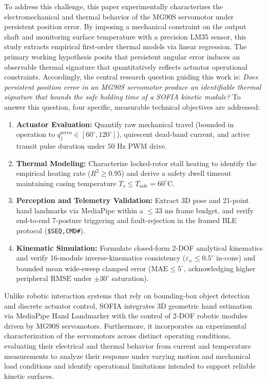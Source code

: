\documentclass[lettersize,journal]{IEEEtran}
\begin{document}
	To address this challenge, this paper experimentally characterizes the electromechanical and thermal behavior of the MG90S servomotor under persistent position error. By imposing a mechanical constraint on the output shaft and monitoring surface temperature with a precision LM35 sensor, this study extracts empirical first-order thermal models via linear regression. The primary working hypothesis posits that persistent angular error induces an observable thermal signature that quantitatively reflects actuator operational constraints. Accordingly, the central research question guiding this work is: \textit{Does persistent position error in an MG90S servomotor produce an identifiable thermal signature that bounds the safe holding time of a SOFIA kinetic module?} To answer this question, four specific, measurable technical objectives are addressed:
	\begin{enumerate}
		\setlength{\itemsep}{0pt}
		\setlength{\parskip}{0pt}
		\setlength{\parsep}{0pt}
		\item {}\textbf{Actuator Evaluation:} Quantify raw mechanical travel (bounded in operation to $q_j^{\text{servo}} \in [60^\circ, 120^\circ]$), quiescent dead-band current, and active transit pulse duration under $50\text{ Hz}$ PWM drive.
		\item {}\textbf{Thermal Modeling:} Characterize locked-rotor stall heating to identify the empirical heating rate ($R^2 \ge 0.95$) and derive a safety dwell timeout maintaining casing temperature $T_s \le T_{\text{safe}} = 60^\circ\text{C}$.
		\item {}\textbf{Perception and Telemetry Validation:} Extract 3D pose and 21-point hand landmarks via MediaPipe within a $\le 33\text{ ms}$ frame budget, and verify end-to-end 7-posture triggering and fault-rejection in the framed BLE protocol (\texttt{\$SEQ,CMD\#}).
		\item {}\textbf{Kinematic Simulation:} Formulate closed-form 2-DOF analytical kinematics and verify 16-module inverse-kinematics consistency ($\varepsilon_\psi \le 0.5^\circ$ in-cone) and bounded mean wide-sweep clamped error ($\text{MAE} \le 5^\circ$, acknowledging higher peripheral $\text{RMSE}$ under $\pm 30^\circ$ saturation).
	\end{enumerate}
	Unlike robotic interaction systems that rely on bounding-box object detection and discrete actuator control, SOFIA integrates 3D geometric hand estimation via MediaPipe Hand Landmarker with the control of 2-DOF robotic modules driven by MG90S servomotors. Furthermore, it incorporates an experimental characterization of the servomotors across distinct operating conditions, evaluating their electrical and thermal behavior from current and temperature measurements to analyze their response under varying motion and mechanical load conditions and identify operational limitations intended to support reliable kinetic surfaces.
	
\end{document}
